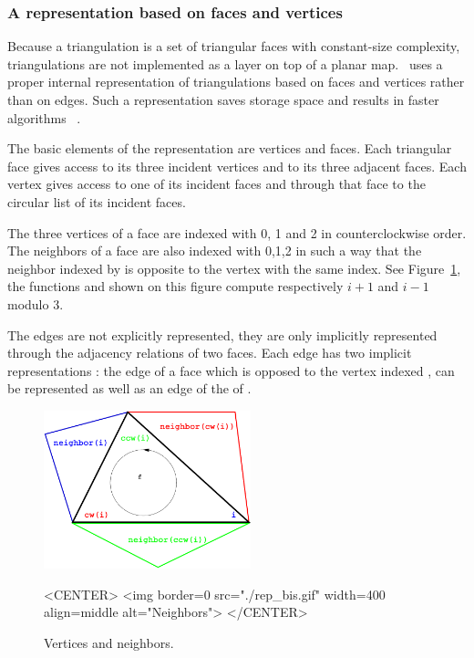 \subsubsection{ A representation based on faces and vertices}
Because a triangulation is  a set of
triangular faces with constant-size complexity,
triangulations are not implemented
as a layer on top of a planar map.
\cgal\ uses a proper internal
representation of triangulations based on faces and vertices
rather than on edges. Such a  representation
saves storage space and results in faster
algorithms~ \cite{bdty-tcgal-00}.

The basic elements of the representation are vertices and faces.
Each triangular face gives access to its three incident vertices 
and to its three adjacent faces. 
Each vertex gives access to one of its incident faces
and through that face to the circular list of its incident faces.

The three vertices of a face are indexed with 0, 1 and 2
in counterclockwise order. The neighbors of a face are also 
indexed with 0,1,2 in such a way that the neighbor indexed by 
is opposite to the vertex with the same index.
See Figure~\ref{2D_Triangulation_Fig_neighbors1}, 
 the functions 
and  shown  on this figure
compute respectively $i+1$ and $i-1$ modulo 3.

The edges are not explicitly represented, they are only implicitly
represented through the adjacency relations of two faces.
Each edge has two implicit representations : the edge
of a face   which is opposed to the vertex indexed ,
can be represented as well as an edge of the  of 
. 


 \begin{figure}
\begin{ccTexOnly}
    \begin{center}
     \includegraphics[width=6cm]{Triangulation_2/rep_bis} 
    \end{center}
\end{ccTexOnly} 
  \begin{ccHtmlOnly}
<CENTER>
<img border=0  src="./rep_bis.gif" width=400 align=middle alt="Neighbors">
</CENTER>
\end{ccHtmlOnly} 

    \caption{Vertices and neighbors. 
    \label{2D_Triangulation_Fig_neighbors1} }
\end{figure}



